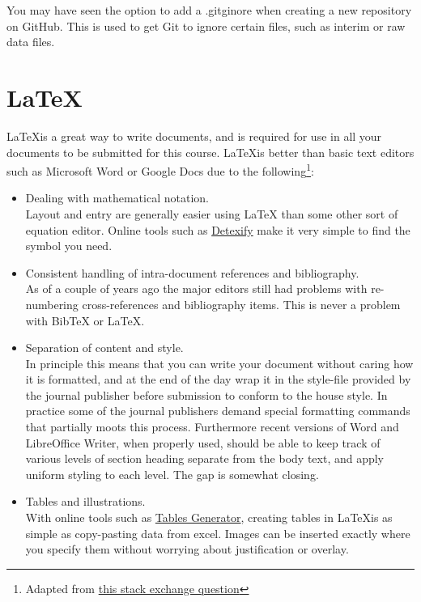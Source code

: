 You may have seen the option to add a .gitginore when creating a new repository on GitHub. This is used to get Git to ignore certain files, such as interim or raw data files. 


\section{\LaTeX}
\LaTeX is a great way to write documents, and is required for use in all your documents to be submitted for this course. \LaTeX is better than basic text editors such as Microsoft Word or Google Docs due to the following\footnote{Adapted from \href{https://academia.stackexchange.com/questions/5414/what-are-the-advantages-or-disadvantages-of-using-latex-for-writing-scientific-p}{this stack exchange question}}:
\begin{itemize}
    \item Dealing with mathematical notation.\\
    Layout and entry are generally easier using LaTeX than some other sort of equation editor. Online tools such as \href{http://detexify.kirelabs.org/classify.html}{Detexify} make it very simple to find the symbol you need.
    \item Consistent handling of intra-document references and bibliography.\\
    As of a couple of years ago the major editors still had problems with re-numbering cross-references and bibliography items. This is never a problem with BibTeX or LaTeX.
    \item Separation of content and style.\\
    In principle this means that you can write your document without caring how it is formatted, and at the end of the day wrap it in the style-file provided by the journal publisher before submission to conform to the house style. In practice some of the journal publishers demand special formatting commands that partially moots this process. Furthermore recent versions of Word and LibreOffice Writer, when properly used, should be able to keep track of various levels of section heading separate from the body text, and apply uniform styling to each level. The gap is somewhat closing.
    \item Tables and illustrations.\\
    With online tools such as \href{https://www.tablesgenerator.com/}{Tables Generator}, creating tables in \LaTeX is as simple as copy-pasting data from excel. Images can be inserted exactly where you specify them without worrying about justification or overlay.
\end{itemize}

